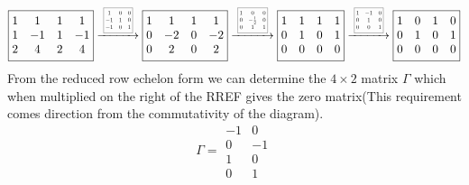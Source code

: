 \documentclass[12pt]{amsart}
\theoremstyle{definition}
\newcommand{\R}{\mathbb{R}}
\DeclareMathOperator{\kernel}{\mathrm{ker}}
\begin{document}
\begin{enumerate}
$$\boxed{\begin{matrix}
1 & 1 & 1 & 1\\
1 & -1 & 1 & -1 \\
2 & 4 & 2 & 4
\end{matrix}}
\xrightarrow{\scalebox{0.5}{\;
\boxed{\begin{matrix}
    1 &0& 0\\
    -1& 1 & 0\\
    -1 & 0 & 1
\end{matrix}}\;}}
\boxed{\begin{matrix}
1 & 1 & 1 & 1\\
0 & -2 & 0 & -2 \\
0 & 2 & 0 & 2
\end{matrix}}
\xrightarrow{\scalebox{0.5}{\;
\boxed{\begin{matrix}
    1 &0& 0\\
    0& -\frac{1}{2} & 0\\
    0 & 1 & 1
\end{matrix}}\;}}
\boxed{\begin{matrix}
1 & 1 & 1 & 1\\
0 & 1 & 0 & 1 \\
0 & 0 & 0 & 0
\end{matrix}}
\xrightarrow{\scalebox{0.5}{\;
\boxed{\begin{matrix}
    1 &-1& 0\\
    0& 1 & 0\\
    0 & 0 & 1
\end{matrix}}\;}}
\boxed{\begin{matrix}
1 & 0 & 1 & 0\\
0 & 1 & 0 & 1 \\
0 & 0 & 0 & 0
\end{matrix}}$$
From the reduced row echelon form we can determine the $4\times 2$ matrix $\Gamma$ which when multiplied on the right of the RREF gives the zero matrix(This requirement comes direction from the commutativity of the diagram).
$$\Gamma=\boxed{\begin{matrix}
-1 & 0\\
0 & -1\\
1 & 0\\
0 & 1

\end{matrix}}$$\\


\end{enumerate}
\end{document}
